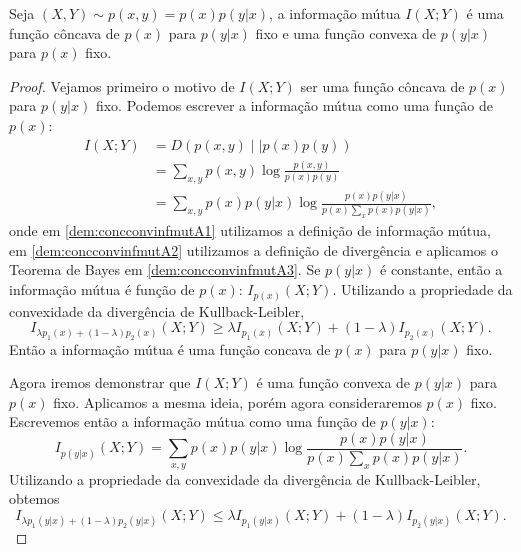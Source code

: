 \begin{theorem}\label{thm:concconvinfmut}
Seja $(X,Y) \sim p(x,y) = p(x)p(y|x)$, a informação mútua $I(X;Y)$ é uma função côncava
de $p(x)$ para $p(y|x)$ fixo e uma função convexa de $p(y|x)$ para $p(x)$ fixo.
\end{theorem}
\begin{proof}
Vejamos primeiro o motivo de $I(X;Y)$ ser uma função côncava de $p(x)$ para $p(y|x)$ fixo.
Podemos escrever a informação mútua como uma função de $p(x)$:
\begin{subequations}\label{dem:concconvinfmutA}
\begin{align}
    I(X;Y) &= D(p(x,y) \mid\mid p(x)p(y)) \label{dem:concconvinfmutA1} \\
       &= \sum_{x,y} p(x,y) \log \frac{p(x,y)}{p(x)p(y)} \label{dem:concconvinfmutA2}\\
       &= \sum_{x,y} p(x)p(y|x) \log \frac{ p(x)p(y|x) }{p(x) \sum_x p(x) p(y|x)}, \label{dem:concconvinfmutA3}
\end{align}
\end{subequations}
onde em \ref{dem:concconvinfmutA1} utilizamos a definição de informação mútua, 
  em \ref{dem:concconvinfmutA2} utilizamos a definição de divergência e aplicamos o Teorema de Bayes em \ref{dem:concconvinfmutA3}.
Se $p(y|x)$ é constante, então a informação mútua é função de $p(x)$: $I_{p(x)} (X;Y)$.
Utilizando a propriedade da convexidade da divergência de Kullback-Leibler,
\begin{equation}\label{eq-Imixpx}
I_{\lambda p_1(x) + (1-\lambda)p_2(x)} (X;Y) \geq \lambda I_{p_1(x)} (X;Y) + (1-\lambda) I_{p_2(x)} (X;Y) .
\end{equation}
Então a informação mútua é uma função concava de $p(x)$ para $p(y|x)$ fixo.

Agora iremos demonstrar que $I(X;Y)$ é uma função convexa de $p(y|x)$ para $p(x)$ fixo.
Aplicamos a mesma ideia, porém agora consideraremos $p(x)$ fixo. Escrevemos então a informação mútua como uma função de $p(y|x)$:
\begin{equation}
I_{p(y|x)} (X;Y) = \sum_{x,y} p(x) p(y|x) \log \frac{p(x) p(y|x)}{p(x) \sum_x p(x) p(y|x)} .
\end{equation}
Utilizando a propriedade da convexidade da divergência de Kullback-Leibler, obtemos
\begin{equation}\label{eq-Imixpxy}
I_{\lambda p_1(y|x) + (1-\lambda)p_2(y|x)} (X;Y) \leq \lambda I_{p_1(y|x)} (X;Y) + (1-\lambda) I_{p_2(y|x)} (X;Y) .
\end{equation}
\end{proof}




